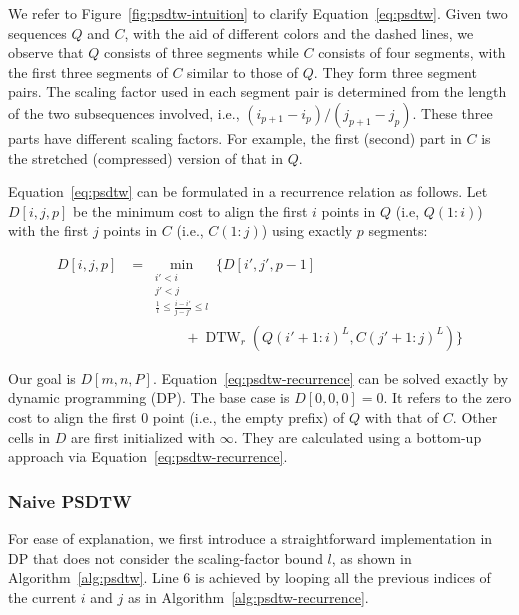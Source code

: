 We refer to Figure~\ref {fig:psdtw-intuition} to clarify Equation~\ref{eq:psdtw}.
Given two sequences $Q$ and $C$, with the aid of different colors and the dashed lines, we observe that $Q$ consists of three segments while $C$ consists of four segments, with the first three segments of $C$ similar to those of $Q$.
They form three segment pairs.
The scaling factor used in each segment pair is determined from the length of the two subsequences involved, i.e., $(i_{p+1}-i_{p})/(j_{p+1}-j_p)$.
These three parts have different scaling factors.
For example, the first (second) part in $C$ is the stretched (compressed) version of that in $Q$.

Equation~\ref{eq:psdtw} can be formulated in a recurrence relation as follows.
Let $D[i, j, p]$ be the minimum cost to align the first $i$ points in $Q$ (i.e, $Q(1:i)$) with the first $j$ points in $C$ (i.e., $C(1:j)$) using exactly $p$ segments:

\begin{equation}
\label{eq:psdtw-recurrence}
\begin{split}
    D[i, j, p] &= \min_{\substack{
    i' < i \\ 
    j' < j \\
    \frac{1}{l} \leq \frac{i - i'}{j - j'} \leq l
    }} \bigg\{ D[i', j', p - 1] \\
    &\qquad\qquad + \operatorname{DTW}_r(Q{(i'+1: i)}^L, C{(j'+1: j)}^L) \bigg\}
\end{split}
\end{equation}

Our goal is $D[m,n,P]$.
Equation~\ref{eq:psdtw-recurrence} can be solved exactly by dynamic programming (DP).
The base case is $D[0,0,0] = 0$.
It refers to the zero cost to align the first $0$ point (i.e., the empty prefix) of $Q$ with that of $C$.
Other cells in $D$ are first initialized with $\infty$.
They are calculated using a bottom-up approach via Equation~\ref{eq:psdtw-recurrence}.

\subsubsection{Naive PSDTW} %



For ease of explanation, we first introduce a straightforward implementation in DP that does not consider the scaling-factor bound $l$, as shown in Algorithm~\ref{alg:psdtw}.
Line 6 is achieved by looping all the previous indices of the current $i$ and $j$ as in Algorithm~\ref{alg:psdtw-recurrence}. 

